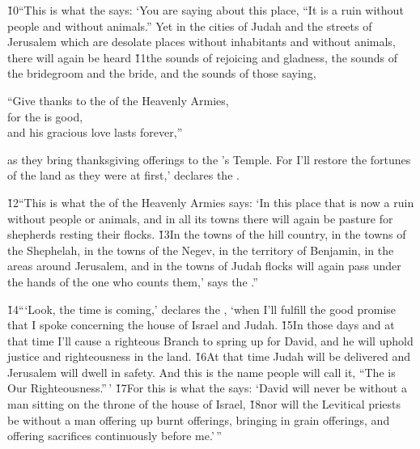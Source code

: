 \v{10}``This is what the  says: `You are saying about this place, ``It is a ruin without people and without animals.'' Yet in the cities of Judah and the streets of Jerusalem which are desolate places without inhabitants and without animals, there will again be heard \v{11}the sounds of rejoicing and gladness, the sounds of the bridegroom and the bride, and the sounds of those saying,

\begin{poetry}
\poeml ``Give thanks to the  of the Heavenly Armies, \\
\poemll    for the  is good, \\
\poemlll       and his gracious love lasts forever,''
\end{poetry}

as they bring thanksgiving offerings to the 's Temple. For I'll restore the fortunes of the land as they were at first,' declares the .

\v{12}``This is what the  of the Heavenly Armies says: `In this place that is now a ruin without people or animals, and in all its towns there will again be pasture for shepherds resting their flocks. \v{13}In the towns of the hill country, in the towns of the Shephelah, in the towns of the Negev, in the territory of Benjamin, in the areas around Jerusalem, and in the towns of Judah flocks will again pass under the hands of the one who counts them,' says the .''

\v{14}```Look, the time is coming,' declares the , `when I'll fulfill the good promise that I spoke concerning the house of Israel and Judah. \v{15}In those days and at that time I'll cause a righteous Branch to spring up for David, and he will uphold justice and righteousness in the land. \v{16}At that time Judah will be delivered and Jerusalem will dwell in safety. And this is the name people will call it, ``The  is Our Righteousness.''\,' \v{17}For this is what the  says: `David will never be without a man sitting on the throne of the house of Israel, \v{18}nor will the Levitical priests be without a man offering up burnt offerings, bringing in grain offerings, and offering sacrifices continuously before me.'\,''

